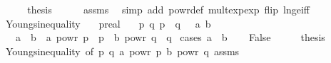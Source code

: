 \begin{isabellebody}
\ \ \isamarkupfalse%
\ \isamarkupfalse%
\ {\isacharquery}{\kern0pt}thesis\isanewline
\ \ \ \ \isamarkupfalse%
\ assms\ \isamarkupfalse%
\ {\isacharparenleft}{\kern0pt}simp\ add{\isacharcolon}{\kern0pt}\ powr{\isacharunderscore}{\kern0pt}def\ mult{\isacharunderscore}{\kern0pt}exp{\isacharunderscore}{\kern0pt}exp\ flip{\isacharcolon}{\kern0pt}\ ln{\isacharunderscore}{\kern0pt}ge{\isacharunderscore}{\kern0pt}iff{\isacharparenright}{\kern0pt}\isanewline
{}\isamarkupfalse%
%
\endisatagproof
{\isafoldproof}%
%
\isadelimproof
\isanewline
%
\endisadelimproof
\isanewline
{}\isamarkupfalse%
\ Youngs{\isacharunderscore}{\kern0pt}inequality{\isacharcolon}{\kern0pt}\isanewline
\ \ \ p{\isacharcolon}{\kern0pt}{\isacharcolon}{\kern0pt}real\isanewline
\ \ \ {\isachardoublequoteopen}p{\isachargreater}{\kern0pt}{}{\isachardoublequoteclose}\ {\isachardoublequoteopen}q{\isachargreater}{\kern0pt}{}{\isachardoublequoteclose}\ {\isachardoublequoteopen}{}{\isacharslash}{\kern0pt}p\ {\isacharplus}{\kern0pt}\ {}{\isacharslash}{\kern0pt}q\ {\isacharequal}{\kern0pt}\ {}{\isachardoublequoteclose}\ {\isachardoublequoteopen}a{\isasymge}{}{\isachardoublequoteclose}\ {\isachardoublequoteopen}b{\isasymge}{}{\isachardoublequoteclose}\isanewline
\ \ \ {\isachardoublequoteopen}a\ {\isacharasterisk}{\kern0pt}\ b\ {\isasymle}\ a\ powr\ p\ {\isacharslash}{\kern0pt}\ p\ {\isacharplus}{\kern0pt}\ b\ powr\ q\ {\isacharslash}{\kern0pt}\ q{\isachardoublequoteclose}\isanewline
%
\isadelimproof
%
\endisadelimproof
%
\isatagproof
{}\isamarkupfalse%
\ {\isacharparenleft}{\kern0pt}cases\ {\isachardoublequoteopen}a{\isacharequal}{\kern0pt}{}\ {\isasymor}\ b{\isacharequal}{\kern0pt}{}{\isachardoublequoteclose}{\isacharparenright}{\kern0pt}\isanewline
\ \ \isamarkupfalse%
\ False\isanewline
\ \ \isamarkupfalse%
\ \isamarkupfalse%
\ {\isacharquery}{\kern0pt}thesis\isanewline
\ \ \isamarkupfalse%
\ Youngs{\isacharunderscore}{\kern0pt}inequality{\isacharunderscore}{\kern0pt}{}\ {\isacharbrackleft}{\kern0pt}of\ {\isachardoublequoteopen}{}{\isacharslash}{\kern0pt}p{\isachardoublequoteclose}\ {\isachardoublequoteopen}{}{\isacharslash}{\kern0pt}q{\isachardoublequoteclose}\ {\isachardoublequoteopen}a\ powr\ p{\isachardoublequoteclose}\ {\isachardoublequoteopen}b\ powr\ q{\isachardoublequoteclose}{\isacharbrackright}{\kern0pt}\ assms\isanewline

\end{isabellebody}
